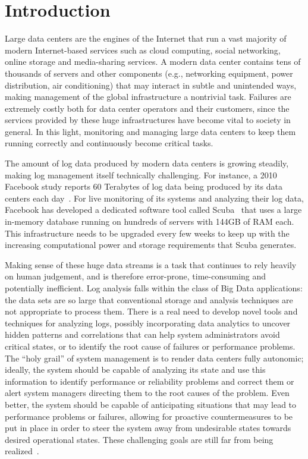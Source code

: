 \documentclass{article}
\begin{document}
\section{Introduction}
\label{intro}
Large data centers are the engines of the Internet that run a vast majority of modern Internet-based services such as cloud computing, social networking, online storage and media-sharing services. A modern data center contains tens of thousands of servers and other components (e.g., networking equipment, power distribution, air conditioning) that may interact in subtle and unintended ways, making management of the global infrastructure a nontrivial task. Failures are extremely costly both for data center operators and their customers, since the services provided by these huge infrastructures have become vital to society in general.  In this light, monitoring and managing large data centers to keep them running correctly and continuously become critical tasks. 

The amount of log data produced by modern data centers is growing steadily, making log management itself technically challenging. For instance, a 2010 Facebook study reports 60 Terabytes of log data being produced by its data centers each day~\cite{Thusoo2010}.  For live monitoring of its systems and analyzing their log data, Facebook has developed a dedicated software tool called Scuba~\cite{Abraham2013} that uses a large in-memory database running on hundreds of servers with 144GB of RAM each. This infrastructure needs to be upgraded every few weeks to keep up with the increasing computational power and storage requirements that Scuba generates.  

Making sense of these huge data streams is a task that continues to rely heavily on human judgement, and is therefore error-prone, time-consuming and potentially inefficient. Log analysis falls within the class of Big Data applications: the data sets are so large that conventional storage and analysis techniques are not appropriate to process them.  There is a real need to develop novel tools and techniques for analyzing logs, possibly incorporating data analytics to uncover hidden patterns and correlations that can help system administrators avoid critical states, or to identify the root cause of failures or performance problems. The ``holy grail'' of system management is to render data centers fully autonomic; ideally, the system should be capable of analyzing its state and use this information to identify performance or reliability problems and correct them or alert system managers directing them to the root causes of the problem. Even better, the system should be capable of anticipating situations that may lead to performance problems or failures, allowing for proactive countermeasures to be put in place in order to steer the system away from undesirable states towards desired operational states. These challenging goals are still far from being realized~\cite{Salfner2010}.
\end{document}
